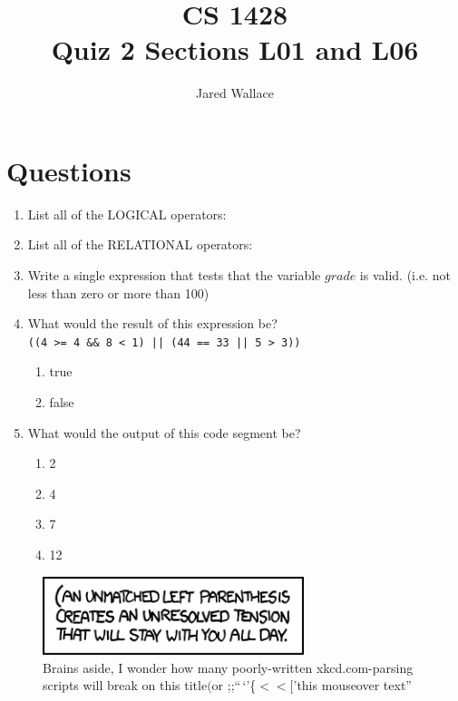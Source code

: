 \documentclass[letterpaper,12pt]{article}
\title{\Large CS 1428\\Quiz 2 Sections L01 and L06}
\author{Jared Wallace}
\date{}
\begin{document}
\maketitle

\section*{Questions}
\begin{enumerate}
	\item List all of the LOGICAL operators:
		\vspace{20mm}
	\item List all of the RELATIONAL operators:
		\vspace{20mm}
	\item Write a single expression that tests that the variable $grade$ is valid. (i.e. not less than zero or more than 100)
		\vspace{15mm}
	\item What would the result of this expression be?\\
		\lstinline$((4 >= 4 && 8 < 1) || (44 == 33 || 5 > 3))$
		\begin{enumerate}
			\item true
			\item false
		\end{enumerate}

	\newpage

	\item What would the output of this code segment be?
		
		\begin{enumerate}
			\item 2
			\item 4
			\item 7
			\item 12
		\end{enumerate}
\end{enumerate}

\vspace{20mm}

\begin{figure}[ht!]
	\centering
	\includegraphics[width=3in]{(.png}
	\caption*{Brains aside, I wonder how many poorly-written xkcd.com-parsing scripts will break on this title$($or ;;``\,`'\{$<<$$[$'this mouseover text''}
\end{figure}
\end{document}
